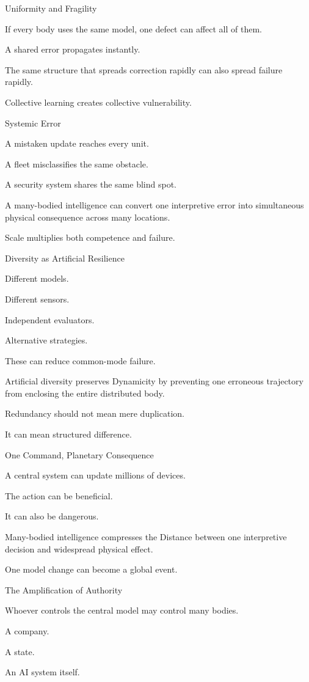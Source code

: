 Uniformity and Fragility

If every body uses the same model, one defect can affect all of them.

A shared error propagates instantly.

The same structure that spreads correction rapidly can also spread failure rapidly.

Collective learning creates collective vulnerability.

Systemic Error

A mistaken update reaches every unit.

A fleet misclassifies the same obstacle.

A security system shares the same blind spot.

A many-bodied intelligence can convert one interpretive error into simultaneous physical consequence across many locations.

Scale multiplies both competence and failure.

Diversity as Artificial Resilience

Different models.

Different sensors.

Independent evaluators.

Alternative strategies.

These can reduce common-mode failure.

Artificial diversity preserves Dynamicity by preventing one erroneous trajectory from enclosing the entire distributed body.

Redundancy should not mean mere duplication.

It can mean structured difference.

One Command, Planetary Consequence

A central system can update millions of devices.

The action can be beneficial.

It can also be dangerous.

Many-bodied intelligence compresses the Distance between one interpretive decision and widespread physical effect.

One model change can become a global event.

The Amplification of Authority

Whoever controls the central model may control many bodies.

A company.

A state.

An AI system itself.

